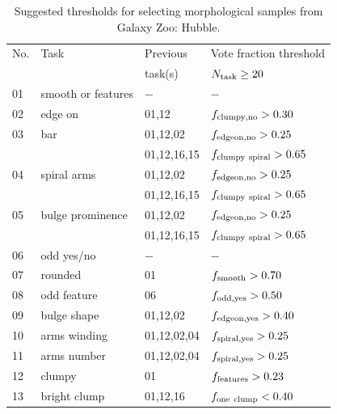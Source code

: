\documentclass[twocolumn]{aastex6}
\begin{document}
\begin{table}
\caption{Suggested thresholds for selecting morphological samples from Galaxy Zoo: Hubble. \label{tbl:thresholds}}
\begin{tabular}{llll}
\hline\hline
No.      &  Task 	            & Previous         & Vote fraction threshold            \\
         &            	        & task(s)          & $N_{\rm task} \ge 20$              \\
\hline
01       & smooth or features   & $-$              & $-$                                \\
02       & edge on              & 01,12            & $f_{\rm clumpy,no}>0.30$           \\
03       & bar		            & 01,12,02         & $f_{\rm edgeon,no}>0.25$           \\
         &                      & 01,12,16,15      & $f_{\rm clumpy~spiral}>0.65$       \\
04       & spiral arms          & 01,12,02         & $f_{\rm edgeon,no}>0.25$           \\
         &                      & 01,12,16,15      & $f_{\rm clumpy~spiral}>0.65$       \\
05       & bulge prominence     & 01,12,02         & $f_{\rm edgeon,no}>0.25$           \\
         &                      & 01,12,16,15      & $f_{\rm clumpy~spiral}>0.65$       \\
06       & odd yes/no           & $-$              & $-$                                \\
07       & rounded              & 01               & $f_{\rm smooth}>0.70$              \\
08       & odd feature          & 06               & $f_{\rm odd,yes}> 0.50$            \\
09       & bulge shape          & 01,12,02         & $f_{\rm edgeon,yes}>0.40$          \\
10       & arms winding         & 01,12,02,04      & $f_{\rm spiral,yes}>0.25$          \\
11       & arms number          & 01,12,02,04      & $f_{\rm spiral,yes}>0.25$          \\
12       & clumpy               & 01               & $f_{\rm features}>0.23$            \\
13       & bright clump         & 01,12,16         & $f_{\rm one~clump}< 0.40$          \\

\end{tabular}
\end{table}
\end{document}
